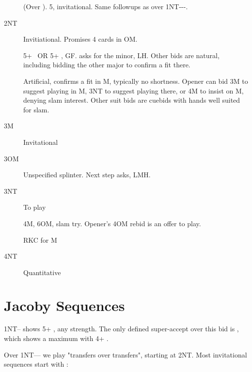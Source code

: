 \documentclass[tom-ari]{subfiles}
\begin{document}
\begin{description}
  \item[] (Over ). 5\spadesuit, invitational. Same followups as over 1NT---.
  \item[2NT] Invitiational. Promises 4 cards in OM.
  \item[] 5+ \clubsuit ~OR 5+ \diamondsuit, GF.  asks for the minor, LH. Other bids are natural, including bidding the other major to confirm a fit there.
  \item[] Artificial, confirms a fit in M, typically no shortness. Opener can bid 3M to suggest playing in M, 3NT to suggest playing there, or 4M to insist on M, denying slam interest. Other suit bids are cuebids with hands well suited for slam.
  \item[3M] Invitational
  \item[3OM] Unspecified splinter. Next step asks, LMH.
  \item[3NT] To play
  \item[] 4M, 6OM, slam try. Opener's 4OM rebid is an offer to play.
  \item[] RKC for M
  \item[4NT] Quantitative
\end{description}

\section{Jacoby Sequences}

1NT-- shows 5+ \heartsuit, any strength. The only defined super-accept over this bid is , which shows a maximum with 4+ \heartsuit.

Over 1NT---- we play "transfers over transfers", starting at 2NT. Most invitational sequences start with :
\end{document}
